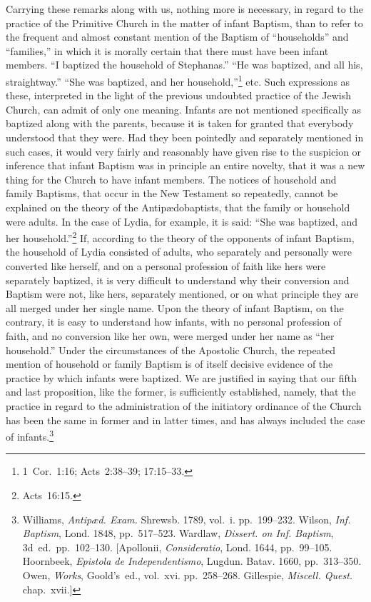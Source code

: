 \documentclass[
]{book}
\begin{document}
Carrying these remarks along with us, nothing more is necessary, in regard to the practice of the Primitive Church in the matter of infant Baptism, than to refer to the frequent and almost constant mention of the Baptism of ``households'' and ``families,'' in which it is morally certain that there must have been infant members. ``I baptized the household of Stephanas.'' ``He was baptized, and all his, straightway.'' ``She was baptized, and her household,''\footnote{1~Cor.~1:16; Acts~2:38--39; 17:15--33.} etc. Such expressions as these, interpreted in the light of the previous undoubted practice of the Jewish Church, can admit of only one meaning. Infants are not mentioned specifically as baptized along with the parents, because it is taken for granted that everybody understood that they were. Had they been pointedly and separately mentioned in such cases, it would very fairly and reasonably have given rise to the suspicion or inference that infant Baptism was in principle an entire novelty, that it was a new thing for the Church to have infant members. The notices of household and family Baptisms, that occur in the New Testament so repeatedly, cannot be explained on the theory of the Antipædobaptists, that the family or household were adults. In the case of Lydia, for example, it is said: ``She was baptized, and her household.''\footnote{Acts~16:15.} If, according to the theory of the opponents of infant Baptism, the household of Lydia consisted of adults, who separately and personally were converted like herself, and on a personal profession of faith like hers were separately baptized, it is very difficult to understand why their conversion and Baptism were not, like hers, separately mentioned, or on what principle they are all merged under her single name. Upon the theory of infant Baptism, on the contrary, it is easy to understand how infants, with no personal profession of faith, and no conversion like her own, were merged under her name as ``her household.'' Under the circumstances of the Apostolic Church, the repeated mention of household or family Baptism is of itself decisive evidence of the practice by which infants were baptized. We are justified in saying that our fifth and last proposition, like the former, is sufficiently established, namely, that the practice in regard to the administration of the initiatory ordinance of the Church has been the same in former and in latter times, and has always included the case of infants.\footnote{Williams, \emph{Antipæd. Exam.} Shrewsb. 1789, vol.~i. pp.~199--232. Wilson, \emph{Inf. Baptism}, Lond. 1848, pp.~517--523. Wardlaw, \emph{Dissert. on Inf. Baptism}, 3d~ed.~pp.~102--130. {[}Apollonii, \emph{Consideratio}, Lond. 1644, pp.~99--105. Hoornbeek, \emph{Epistola de Independentismo}, Lugdun. Batav. 1660, pp.~313--350. Owen, \emph{Works}, Goold's~ed., vol.~xvi. pp.~258--268. Gillespie, \emph{Miscell. Quest.} chap.~xvii.{]}}
\end{document}
